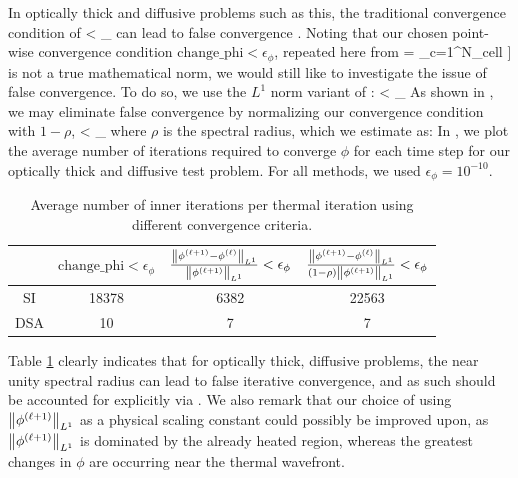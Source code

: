 In optically thick and diffusive problems such as this, the traditional convergence condition of 
\benum
{} < \epsilon_{\phi} \pec
\label{eq:no_norm}
\eenum
can lead to false convergence \cite{adams_larsen_fast_iterative}.
Noting that our chosen point-wise convergence condition $\text{change\_phi} < \epsilon_{\phi}$, repeated here from 
\benum
{} = \max_{c=1}^{N_{cell}} \left[ \max_{j=1}^{N_P} \left[ { \abs{ \frac{ \phi^{(\ell+1)}_{c,j} - \phi^{(\ell)}_{c,j}}{\phi^{(\ell+1)}_{c,j} }} } \right] \right] \pep
\eenum
is not a true mathematical norm, we would still like to investigate the issue of false convergence.
To do so, we use the $L^1$ norm variant of :
\benum
{} < \epsilon_{\phi} \pep
\label{eq:l1}
\eenum
As shown in \cite{adams_larsen_fast_iterative}, we may eliminate false convergence by normalizing our convergence condition with $1-\rho$,
\benum
{}< \epsilon_{\phi} \pec
\label{eq:rho_convergence}
\eenum
where $\rho$ is the spectral radius, which we estimate as:
\benum
\rho \approx {}\pep
\eenum
In , we plot the average number of iterations required to converge $\phi$ for each time step for our optically thick and diffusive test problem.  
For all methods, we used $\epsilon_{\phi} = 10^{-10}$.
\begin{table}[!hbp]
\centering
\caption{Average number of inner iterations per thermal iteration using different convergence criteria.}
\label{tbl:rho_iters}
\begin{tabular}{|c|c|c|c|}
\hline
{}  &  $\text{change\_phi} <\epsilon_{\phi}$  & 
		$ \frac{\left\lVert  \phi^{(\ell+1)} - \phi^{(\ell)}  \right\rVert_{L^1} }{ \left\lVert  \phi^{(\ell+1)} \right\rVert_{L^1}  } < \epsilon_{\phi}$ & 
		$\frac{\left\lVert \phi^{(\ell+1)} - \phi^{(\ell)}  \right\rVert_{L^1} }{ (1- \rho) \left\lVert \phi^{(\ell+1)} \right\rVert_{L^1} }< \epsilon_{\phi} $  \\[0.2in]		
		\hline
SI & 18378 & 6382 & 22563 \\
\hline
DSA & 10 & 7 & 7 \\
\hline
\end{tabular}
\end{table}
Table \ref{tbl:rho_iters} clearly indicates that for optically thick, diffusive problems, the near unity spectral radius can lead to false iterative convergence, and as such should be accounted for explicitly via .  
We also remark that our choice of using $\left\lVert \phi^{(\ell+1)}  \right\rVert_{L^1}$ as a physical scaling constant could possibly be improved upon, as $\left\lVert \phi^{(\ell+1)} \right\rVert_{L^1}$ is dominated by the already heated region, whereas the greatest changes in $\phi$ are occurring near the thermal wavefront.



